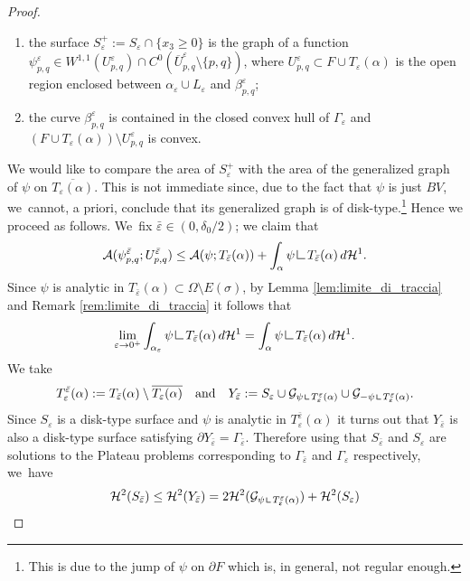 \documentclass[JEP,XML,SOM,Unicode, NoFloatCountersInSection,published]{cedram}
\let\eps\varepsilon
\let\Om\Omega
\newcommand{\resa}{\mathop{\hbox{\vrule height 7pt width 0.5pt depth 0pt
\vrule height 0.5pt width 6pt depth 0pt}}\nolimits}
\newcommand{\resb}{\mathop{\hbox{\vrule height 4pt width 0.5pt depth 0pt
\vrule height 0.5pt width 3pt depth 0pt}}\nolimits}
\newcommand{\res}{\mathchoice{\resa}{\resa}{\resb}{\resb}}
\theoremstyle{definition}
\begin{document}
\begin{proof}
\begin{enumerate}[{\rm (1)},wide]
\item the surface $S^+_\eps:=S_\eps\cap\{x_3\ge0\}$
is the graph of a function $\psi_{p,q}^\eps\in W^{1,1}( U_{p,q}^\eps)
\cap C^0(\overline U_{p,q}^\eps\setminus\{p,q\})$, where $U_{p,q}^\eps\subset F\cup T_\eps(\alpha)$ is the open region enclosed between $\alpha_\eps\cup L_\eps$ and $\beta_{p,q}^{\eps}$;
\item the curve $\beta_{p,q}^\eps$ is contained in the closed
convex hull of $\Gamma_\eps$ and $( F\cup T_\eps(\alpha))\setminus U_{p,q}^\eps$ is convex.
\end{enumerate}
We would like to compare the area of $S_\eps^+$ with the area of the generalized graph of $\psi$ on $\overline {T_\eps(\alpha)}$. This is not immediate since, due to the fact that $\psi$ is just $BV$, we~cannot, a priori, conclude that its generalized graph is of disk-type.\footnote{This is due to the jump of $\psi$ on $\partial F$ which is, in general, not regular enough.} Hence we proceed as follows. We~fix $\bar\eps\in(0,\delta_0/2)$; we claim that
\begin{equation}\label{eq:comparison-with-plateau}
\mathcal{A}(\psi_{p,q}^{\bar\eps}; U_{p,q}^{\bar\eps})
\le
\mathcal{A}(\psi; T_{\bar\eps}(\alpha))+
\int_{\alpha}\psi\res{T_{\bar\eps}(\alpha)}\,d\mathcal{H}^1.
\end{equation}
Since $\psi$ is analytic in $T_{\bar\eps}(\alpha)\subset\Om\setminus E(\sigma)$, by Lemma \ref{lem:limite_di_traccia} and Remark \ref{rem:limite_di_traccia} it follows that
\begin{equation}\label{claim}
\lim_{\eps\to0^+}
\int_{\alpha_\eps}\psi\res{T_{\bar\eps}(\alpha)}\,d\mathcal{H}^1=\int_{\alpha}\psi\res{T_{\bar\eps}(\alpha)}\,d\mathcal{H}^1.
\end{equation}
We take
\[
T_{\eps}^{\bar\eps}(\alpha):={T_{\bar\eps}(\alpha)\setminus \overline {T_{\eps}(\alpha)}}\quad\text{and}\quad Y_{\bar\eps}:=S_{\eps}\cup\mathcal{G}_{\psi\res T_\eps^{\bar\eps}(\alpha)} \cup\mathcal{G}_{-\psi\res T_\eps^{\bar\eps}(\alpha)}.
\]
Since $S_\eps$ is a disk-type surface and $\psi$ is analytic in $T_\eps^{\bar\eps}(\alpha)$ it turns out that $Y_{\bar\eps}$ is also a disk-type surface satisfying $\partial Y_{\bar\eps}=\Gamma_{\bar\eps}$. Therefore using that $S_{\bar\eps}$ and $S_\eps$ are solutions to the Plateau problems corresponding to $\Gamma_{\bar\eps}$ and $\Gamma_\eps$ respectively, we~have
\begin{equation*}
\begin{split}
\mathcal{H}^2(S_{\bar\eps})\le \mathcal{H}^2(Y_{\bar\eps})&= 2\mathcal{H}^2(\mathcal{G}_{\psi\res T_\eps^{\bar\eps}(\alpha)} )+\mathcal{H}^2(S_\eps)\\

\end{split}
\end{equation*}
\end{proof}
\end{document}
